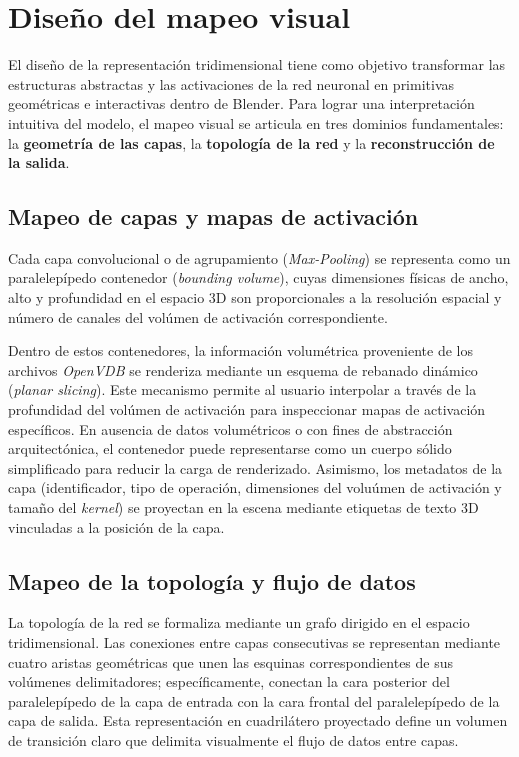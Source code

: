 \section{Diseño del mapeo visual}
El diseño de la representación tridimensional tiene como objetivo transformar las estructuras 
abstractas y las activaciones de la red neuronal en primitivas geométricas e 
interactivas dentro de Blender. Para lograr una interpretación intuitiva del modelo, el mapeo 
visual se articula en tres dominios fundamentales: la \textbf{geometría de las capas}, la 
\textbf{topología de la red} y la \textbf{reconstrucción de la salida}.

\subsection{Mapeo de capas y mapas de activación}
Cada capa convolucional o de agrupamiento (\textit{Max-Pooling}) se representa como un 
paralelepípedo contenedor (\textit{bounding volume}), cuyas dimensiones físicas de ancho, 
alto y profundidad en el espacio 3D son proporcionales a la resolución espacial y número de 
canales del volúmen de activación correspondiente.
\medskip

Dentro de estos contenedores, la información volumétrica proveniente de los archivos 
\textit{OpenVDB} se renderiza mediante un esquema de rebanado dinámico (\textit{planar slicing}). 
Este mecanismo permite al usuario interpolar a través de la profundidad del volúmen de activación para inspeccionar 
mapas de activación específicos. En ausencia de datos volumétricos o con fines de abstracción 
arquitectónica, el contenedor puede representarse como un cuerpo sólido simplificado para reducir 
la carga de renderizado. Asimismo, los metadatos de la capa (identificador, tipo de operación, 
dimensiones del voluúmen de activación y tamaño del \textit{kernel}) se proyectan en la escena mediante etiquetas
de texto 3D vinculadas a la posición de la capa.

\subsection{Mapeo de la topología y flujo de datos}
La topología de la red se formaliza mediante un grafo dirigido en el espacio tridimensional. 
Las conexiones entre capas consecutivas se representan mediante cuatro aristas geométricas que unen 
las esquinas correspondientes de sus volúmenes delimitadores; específicamente, conectan la cara 
posterior del paralelepípedo de la capa de entrada con la cara frontal del paralelepípedo de la capa 
de salida. Esta representación en cuadrilátero proyectado define un volumen de transición claro que 
delimita visualmente el flujo de datos entre capas.
\medskip

